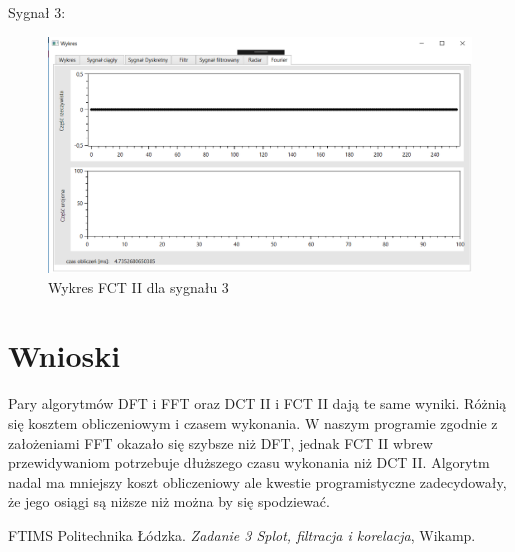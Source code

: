 \documentclass[12pt]{article}
\begin{document}
\newpage
Sygnał 3:
\begin{figure}[h!]
 \centering
 \includegraphics[width=12.3cm]{s18FCT2.PNG}
 \vspace{-0.3cm}
 \caption{Wykres FCT II dla sygnału 3}
 \label{Wykres dla wyników eksperymentu pierwszego}
\end{figure}





\section{Wnioski}
Pary algorytmów DFT i FFT oraz DCT II i FCT II dają te same wyniki. Różnią się kosztem obliczeniowym i czasem wykonania. W naszym programie zgodnie z założeniami FFT okazało się szybsze niż DFT, jednak FCT II wbrew przewidywaniom potrzebuje dłuższego czasu wykonania niż DCT II. Algorytm nadal ma mniejszy koszt obliczeniowy ale kwestie programistyczne zadecydowały, że jego osiągi są niższe niż można by się spodziewać.

\begin{thebibliography}{0}
  FTIMS Politechnika Łódzka.
    \textsl{Zadanie 3 Splot, filtracja i korelacja}, Wikamp.
\end{thebibliography}
\end{document}
